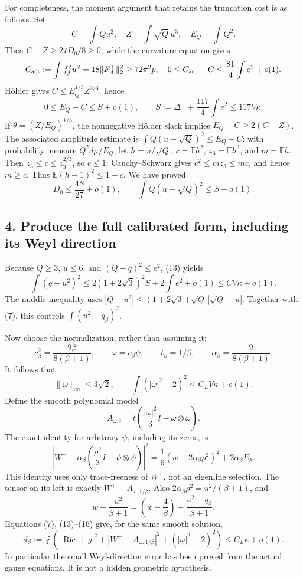 \documentclass[
  10pt,
]{article}
\begin{document}
For completeness, the moment argument that retains the truncation cost
is as follows. Set \[
C=\int Qu^2,\quad Z=\int\sqrt Q\,u^3,\quad E_Q=\int Q^2.
\] Then \(C-Z\ge27D_0/8\ge0\), while the curvature equation gives \[
C_{\rm act}:=\int f_j^2u^2=18\|F_A^+\|_2^2\ge72\pi^2p,
\quad 0\le C_{\rm act}-C\le\frac{81}{4}\int e^2+o(1).
\] Hölder gives \(C\le E_Q^{1/3}Z^{2/3}\), hence \[
0\le E_Q-C\le S+o(1),\qquad
S:=\Delta_++\frac{117}{4}\int e^2\le117V\kappa.
\] If \(\theta=(Z/E_Q)^{1/3}\), the nonnegative Hölder slack implies
\(E_Q-C\ge2(C-Z)\). The associated amplitude estimate is
\(\int Q(u-\sqrt Q)^2\le E_Q-C\): with probability measure
\(Q^2d\mu/E_Q\), let \(h=u/\sqrt Q\), \(c=\mathbb E h^2\),
\(z_3=\mathbb E h^3\), and \(m=\mathbb E h\). Then
\(z_3\le c\le z_3^{2/3}\), so \(c\le1\); Cauchy--Schwarz gives
\(c^2\le m z_3\le mc\), and hence \(m\ge c\). Thus
\(\mathbb E(h-1)^2\le1-c\). We have proved \[
D_0\le\frac{4S}{27}+o(1),\qquad
\int Q(u-\sqrt Q)^2\le S+o(1).
\tag{13}
\]

\hypertarget{produce-the-full-calibrated-form-including-its-weyl-direction}{%
\subsection{4. Produce the full calibrated form, including its Weyl
direction}\label{produce-the-full-calibrated-form-including-its-weyl-direction}}

Because \(Q\ge3\), \(u\le6\), and \((Q-q)^2\le e^2\), (13) yields \[
\int(q-u^2)^2
\le2(1+2\sqrt3)^2S+2\int e^2+o(1)
\le C V\kappa+o(1).
\tag{14}
\] The middle inequality uses
\(|Q-u^2|\le(1+2\sqrt3)\sqrt Q\,|\sqrt Q-u|\). Together with (7), this
controls \(\int(u^2-q_\beta)^2\).

Now choose the normalization, rather than assuming it: \[
c_\beta^2=\frac{9\beta}{8(\beta+1)},\qquad
\omega=c_\beta\psi,\qquad t_\beta=1/\beta,\qquad
\alpha_\beta=\frac9{8(\beta+1)}.
\] It follows that \[
\|\omega\|_\infty\le3\sqrt2,\qquad
\int(|\omega|^2-2)^2\le C_L V\kappa+o(1).
\tag{15}
\] Define the smooth polynomial model \[
A_{\omega,t}=t\left(\frac{|\omega|^2}{3}I-\omega\otimes\omega\right).
\] The exact identity for arbitrary \(\psi\), including its zeros, is \[
\left|W^+-\alpha_\beta
       \left(\frac{\rho^2}{3}I-\psi\otimes\psi\right)\right|^2
=\frac16(w-2\alpha_\beta\rho^2)^2
+2\alpha_\beta E_\lambda.
\tag{16}
\] This identity uses only trace-freeness of \(W^+\), not an eigenline
selection. The tensor on its left is exactly \(W^+-A_{\omega,1/\beta}\).
Also \(2\alpha_\beta\rho^2=u^2/(\beta+1)\), and \[
w-\frac{u^2}{\beta+1}
=\left(w-\frac4\beta\right)
-\frac{u^2-q_\beta}{\beta+1}.
\] Equations (7), (13)--(16) give, for the same smooth solution, \[
d_\beta:=\fint\left(
 |\operatorname{Ric}+g|^2+|W^+-A_{\omega,1/\beta}|^2
+(|\omega|^2-2)^2\right)
\le C_L\kappa+o(1).
\tag{17}
\] In particular the small Weyl-direction error has been proved from the
actual gauge equations. It is not a hidden geometric hypothesis.
\end{document}

